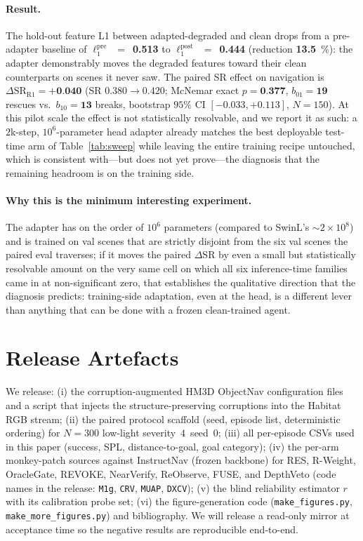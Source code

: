 \paragraph{Result.}
The hold-out feature L1 between adapted-degraded and clean drops from a
pre-adapter baseline of $\ell_1^{\text{pre}}$~$=$~\textbf{0.513} to
$\ell_1^{\text{post}}$~$=$~\textbf{0.444} (reduction \textbf{13.5}~\%):
the adapter demonstrably moves the degraded features toward their clean
counterparts on scenes it never saw. The paired SR effect on navigation
is $\Delta\text{SR}_{\text{R1}}{=}\textbf{+0.040}$
(SR $0.380\to0.420$; McNemar exact $p{=}\textbf{0.377}$,
$b_{01}{=}\textbf{19}$ rescues vs.\ $b_{10}{=}\textbf{13}$ breaks,
bootstrap $95\%$ CI $[-0.033,+0.113]$, $N{=}150$). At this pilot scale
the effect is not statistically resolvable, and we report it as such: a
$2$k-step, $10^{6}$-parameter head adapter already matches the best
deployable test-time arm of Table~\ref{tab:sweep} while leaving the entire training
recipe untouched, which is consistent with---but does not yet
prove---the diagnosis that the remaining headroom is on the training
side.

\paragraph{Why this is the minimum interesting experiment.} The adapter
has on the order of $10^{6}$ parameters (compared to SwinL's
$\sim2\!\times\!10^{8}$) and is trained on val scenes that are strictly
disjoint from the six val scenes the paired eval traverses; if it moves the
paired $\Delta\text{SR}$ by even a small but statistically resolvable
amount on the very same cell on which all six inference-time families
came in at non-significant zero, that establishes the qualitative
direction that the diagnosis predicts: training-side adaptation, even at
the head, is a different lever than anything that can be done with a
frozen clean-trained agent.

\section{Release Artefacts}
\label{app:release}

We release: (i) the corruption-augmented HM3D ObjectNav configuration files
and a script that injects the structure-preserving corruptions into the
Habitat RGB stream; (ii) the paired protocol scaffold (seed, episode list,
deterministic ordering) for $N{=}300$ low-light severity~$4$~seed~$0$; (iii) all
per-episode CSVs used in this paper (success, SPL, distance-to-goal, goal
category); (iv) the per-arm monkey-patch sources against InstructNav
(frozen backbone) for RES, R-Weight, OracleGate, REVOKE, NearVerify,
ReObserve, FUSE, and DepthVeto (code names in the release:
\texttt{M1g}, \texttt{CRV}, \texttt{MUAP}, \texttt{DXCV});
(v) the blind reliability estimator $r$ with its calibration probe set;
(vi) the figure-generation code (\texttt{make\_figures.py},
\texttt{make\_more\_figures.py}) and bibliography. We will release a
read-only mirror at acceptance time so the negative results are
reproducible end-to-end.
